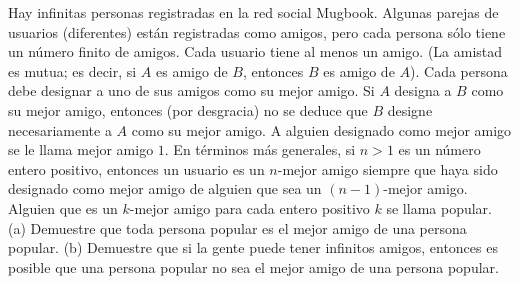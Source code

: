 Hay infinitas personas registradas en la red social Mugbook. Algunas parejas de usuarios (diferentes) están registradas como amigos, pero cada persona sólo tiene un número finito de amigos. Cada usuario tiene al menos un amigo. (La amistad es mutua; es decir, si $A$ es amigo de $B$, entonces $B$ es amigo de $A$).
Cada persona debe designar a uno de sus amigos como su mejor amigo. Si $A$ designa a $B$ como su mejor amigo, entonces (por desgracia) no se deduce que $B$ designe necesariamente a $A$ como su mejor amigo. A alguien designado como mejor amigo se le llama mejor amigo $1$. En términos más generales, si $n\gt 1$ es un número entero positivo, entonces un usuario es un $n$-mejor amigo siempre que haya sido designado como mejor amigo de alguien que sea un $(n-1)$-mejor amigo. Alguien que es un $k$-mejor amigo para cada entero positivo $k$ se llama popular.
(a) Demuestre que toda persona popular es el mejor amigo de una persona popular.
(b) Demuestre que si la gente puede tener infinitos amigos, entonces es posible que una persona popular no sea el mejor amigo de una persona popular.

